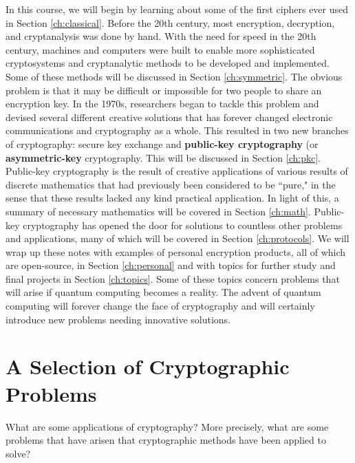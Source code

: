  In this course, we will begin by learning about some of the first ciphers ever used in Section \ref{ch:classical}. Before the 20th century, most encryption, decryption, and cryptanalysis was done by hand. With the need for speed in the 20th century, machines and computers were built to enable more sophisticated cryptosystems and cryptanalytic methods to be developed and implemented. Some of these methods will be discussed in Section \ref{ch:symmetric}. The obvious problem is that it may be difficult or impossible for two people to share an encryption key. In the 1970s, researchers began to tackle this problem and devised several different creative solutions that has forever changed electronic communications and cryptography as a whole. This resulted in two new branches of cryptography: secure key exchange  and {\bf public-key cryptography}  (or {\bf asymmetric-key} cryptography. This will be discussed in Section \ref{ch:pkc}. Public-key cryptography is the result of creative applications of various results of discrete mathematics that had previously been considered to be ``pure," in the sense that these results lacked any kind practical application. In light of this, a summary of necessary mathematics will be covered in Section \ref{ch:math}. Public-key cryptography has opened the door for solutions to countless other problems and applications, many of which will be covered in Section \ref{ch:protocols}. We will wrap up these notes with examples of personal encryption products, all of which are open-source, in Section \ref{ch:personal} and with topics for further study and final projects in Section \ref{ch:topics}. Some of these topics concern problems that will arise if quantum computing becomes a reality. The advent of quantum computing will forever change the face of cryptography and will certainly introduce new problems needing innovative solutions.

	\section{A Selection of Cryptographic Problems}

	What are some applications of cryptography? More precisely, what are some problems that have arisen that cryptographic methods have been applied to solve?

